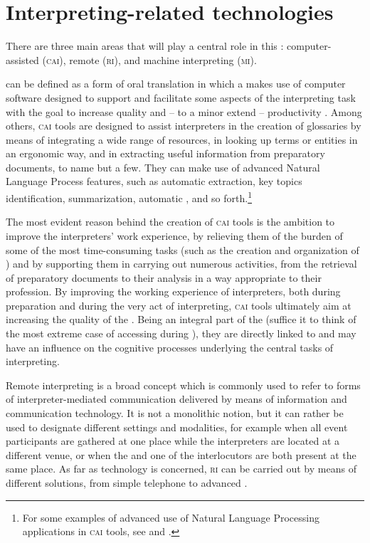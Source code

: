 \documentclass[output=paper]{langsci/langscibook}
\begin{document}
\section{Interpreting-related technologies} 
There are three main areas that will play a central role in this : computer-assisted (\textsc{cai}), remote (\textsc{ri}), and machine interpreting (\textsc{mi}). 
 
 can be defined as a form of oral translation in which a  makes use of computer software designed to support and facilitate some aspects of the interpreting task with the goal to increase quality and -- to a minor extend -- productivity \citep{Fantinuoli2018}. Among others, \textsc{cai} tools are designed to assist interpreters in the creation of glossaries by means of integrating a wide range of  resources, in looking up terms or entities in an ergonomic way, and in extracting useful information from preparatory documents, to name but a few. They can make use of advanced Natural Language Process features, such as automatic  extraction, key topics identification, summarization, automatic , and so forth.\footnote{For some examples of advanced use of Natural Language Processing applications in \textsc{cai} tools, see 
\citet{Fantinuoli2017b}
and \citet{stewart_automatic_2018}.} 
 
The most evident reason behind the creation of \textsc{cai} tools is the ambition to improve the interpreters’ work experience, by relieving them of the burden of some of the most time-consuming tasks (such as the creation and organization of ) and by supporting them in carrying out numerous activities, from the retrieval of preparatory documents to their analysis in a way appropriate to their profession. By improving the working experience of interpreters, both during preparation and during the very act of interpreting, \textsc{cai} tools ultimately aim at increasing the quality of the . Being an integral part of the  (suffice it to think of the most extreme case of accessing  during ), they are directly linked to and may have an influence on the cognitive processes underlying the central tasks of interpreting.   
 
Remote interpreting is a broad concept which is commonly used to refer to forms of interpreter-mediated communication delivered by means of information and communication technology. It is not a monolithic notion, but it can rather be used to designate different settings and modalities, for example when all event participants are gathered at one place while the interpreters are located at a different venue, or when the  and one of the interlocutors are both present at the same place. As far as technology is concerned, \textsc{ri} can be carried out by means of different solutions, from simple telephone to advanced  . 
 
\end{document}
